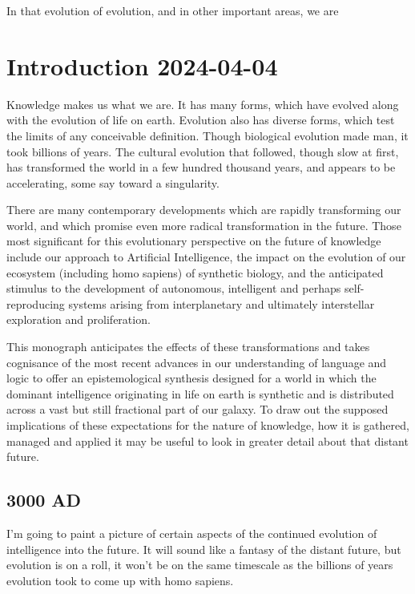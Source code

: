 \documentclass[10pt,titlepage]{book}
\begin{document}
In that evolution of evolution, and in other important areas, we are

\chapter{Introduction 2024-04-04}

Knowledge makes us what we are.
It has many forms, which have evolved along with the evolution of life on earth.
Evolution also has diverse forms, which test the limits of any conceivable definition.
Though biological evolution made man, it took billions of years.
The cultural evolution that followed, though slow at first, has transformed the world in a few hundred thousand years, and appears to be accelerating, some say toward a singularity.

There are many contemporary developments which are rapidly transforming our world, and which promise even more radical transformation in the future.
Those most significant for this evolutionary perspective on the future of knowledge include our approach to Artificial Intelligence, the impact on the evolution of our ecosystem (including homo sapiens) of synthetic biology, and the anticipated stimulus to the development of autonomous, intelligent and perhaps self-reproducing systems arising from interplanetary and ultimately interstellar exploration and proliferation.

This monograph anticipates the effects of these transformations and takes cognisance of the most recent advances in our understanding of language and logic to offer an epistemological synthesis designed for a world in which the dominant intelligence originating in life on earth is synthetic and is distributed across a vast but still fractional part of our galaxy.
To draw out the supposed implications of these expectations for the nature of knowledge, how it is gathered, managed and applied it may be useful to look in greater detail about that distant future.

\section{3000 AD}

I'm going to paint a picture of certain aspects of the continued evolution of intelligence into the future.
It will sound like a fantasy of the distant future, but evolution is on a roll, it won't be on the same timescale as the billions of years evolution took to come up with homo sapiens.
\end{document}
